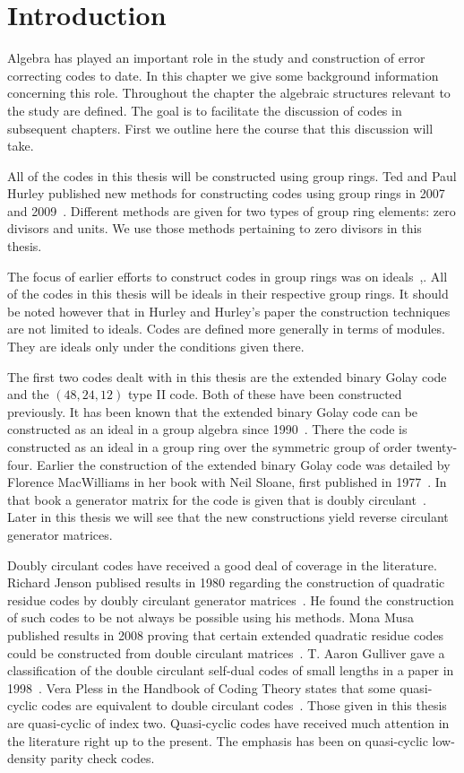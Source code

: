 \chapter{Introduction}
\label{chap:intro}
Algebra has played an important role in the study and construction of error correcting codes to date.
In this chapter we give some background information concerning this role.
Throughout the chapter the algebraic structures relevant to the study are defined.
The goal is to facilitate the discussion of codes in subsequent chapters.
First we outline here the course that this discussion will take.

All of the codes in this thesis will be constructed using group rings.
Ted and Paul Hurley published new methods for constructing codes using group rings in 2007 and 2009~\cite{hur07,hur09}.
Different methods are given for two types of group ring elements: zero divisors and units.
We use those methods pertaining to zero divisors in this thesis.

The focus of earlier efforts to construct codes in group rings was on ideals~\cite[p.~829]{han98a},\cite{hug00}.
All of the codes in this thesis will be ideals in their respective group rings.
It should be noted however that in Hurley and Hurley's paper the construction techniques are not limited to ideals.
Codes are defined more generally in terms of modules.
They are ideals only under the conditions given there.

The first two codes dealt with in this thesis are the extended binary Golay code and the $(48,24,12)$ type II code.
Both of these have been constructed previously.
It has been known that the extended binary Golay code can be constructed as an ideal in a group algebra since 1990~\cite{lan90}.
There the code is constructed as an ideal in a group ring over the symmetric group of order twenty-four.
Earlier the construction of the extended binary Golay code was detailed by Florence MacWilliams in her book with Neil Sloane, first published in 1977~\cite[p.~634]{mac77}.
In that book a generator matrix for the code is given that is doubly circulant~\cite[p.~498]{mac77}.
Later in this thesis we will see that the new constructions yield reverse circulant generator matrices.

Doubly circulant codes have received a good deal of coverage in the literature.
Richard Jenson publised results in 1980 regarding the construction of quadratic residue codes by doubly circulant generator matrices~\cite{jen80}.
He found the construction of such codes to be not always be possible using his methods.
Mona Musa published results in 2008 proving that certain extended quadratic residue codes could be constructed from double circulant matrices~\cite{mus08}.
T. Aaron Gulliver gave a classification of the double circulant self-dual codes of small lengths in a paper in 1998~\cite{gul98}.
Vera Pless in the Handbook of Coding Theory states that some quasi-cyclic codes are equivalent to double circulant codes~\cite[p.~60]{han98a}.
Those given in this thesis are quasi-cyclic of index two.
Quasi-cyclic codes have received much attention in the literature right up to the present.
The emphasis has been on quasi-cyclic low-density parity check codes.

